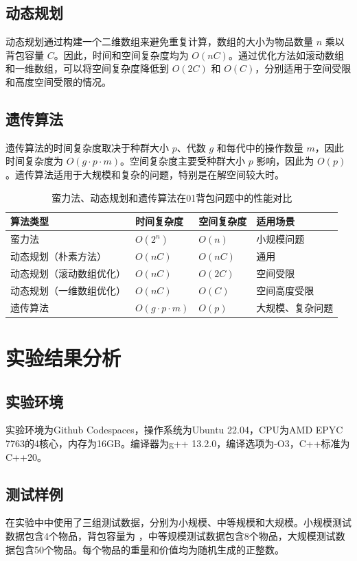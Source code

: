 \documentclass[UTF8,titlepage]{ctexart}
\numberwithin{figure}{section}
\begin{document}
\subsection{动态规划}
动态规划通过构建一个二维数组来避免重复计算，数组的大小为物品数量 $n$ 乘以背包容量 $C$。因此，时间和空间复杂度均为 $O(nC)$。通过优化方法如滚动数组和一维数组，可以将空间复杂度降低到 $O(2C)$ 和 $O(C)$，分别适用于空间受限和高度空间受限的情况。

\subsection{遗传算法}
遗传算法的时间复杂度取决于种群大小 $p$、代数 $g$ 和每代中的操作数量 $m$，因此时间复杂度为 $O(g \cdot p \cdot m)$。空间复杂度主要受种群大小 $p$ 影响，因此为 $O(p)$。遗传算法适用于大规模和复杂的问题，特别是在解空间较大时。
\begin{table}[htbp]
    \centering
    \caption{蛮力法、动态规划和遗传算法在01背包问题中的性能对比}
    \begin{tabular}{@{}llll@{}}
    \toprule
    算法类型 & 时间复杂度 & 空间复杂度 & 适用场景 \\ \midrule
    蛮力法 & $O(2^n)$ & $O(n)$ & 小规模问题 \\
    动态规划（朴素方法） & $O(nC)$ & $O(nC)$ & 通用 \\
    动态规划（滚动数组优化） & $O(nC)$ & $O(2C)$ & 空间受限 \\
    动态规划（一维数组优化） & $O(nC)$ & $O(C)$ & 空间高度受限 \\
    遗传算法 & $O(g \cdot p \cdot m)$ & $O(p)$ & 大规模、复杂问题 \\ \bottomrule
    \end{tabular}
    \end{table}

\newpage

\section{实验结果分析}

\subsection{实验环境}
实验环境为Github Codespaces，操作系统为Ubuntu 22.04，CPU为AMD EPYC 7763的4核心，内存为16GB。编译器为g++ 13.2.0，编译选项为-O3，C++标准为C++20。

\subsection{测试样例}
在实验中中使用了三组测试数据，分别为小规模、中等规模和大规模。小规模测试数据包含4个物品，背包容量为 ，中等规模测试数据包含8个物品，大规模测试数据包含50个物品。每个物品的重量和价值均为随机生成的正整数。
\end{document}
